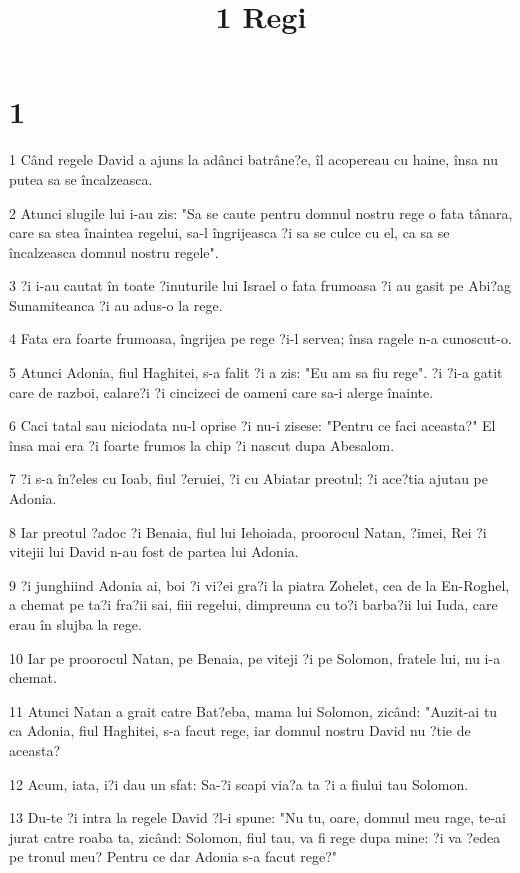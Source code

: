 

\title{1 Regi}


\chapter{1}

\par 1 Când regele David a ajuns la adânci batrâne?e, îl acopereau cu haine, însa nu putea sa se încalzeasca.
\par 2 Atunci slugile lui i-au zis: "Sa se caute pentru domnul nostru rege o fata tânara, care sa stea înaintea regelui, sa-l îngrijeasca ?i sa se culce cu el, ca sa se încalzeasca domnul nostru regele".
\par 3 ?i i-au cautat în toate ?inuturile lui Israel o fata frumoasa ?i au gasit pe Abi?ag Sunamiteanca ?i au adus-o la rege.
\par 4 Fata era foarte frumoasa, îngrijea pe rege ?i-l servea; însa ragele n-a cunoscut-o.
\par 5 Atunci Adonia, fiul Haghitei, s-a falit ?i a zis: "Eu am sa fiu rege". ?i ?i-a gatit care de razboi, calare?i ?i cincizeci de oameni care sa-i alerge înainte.
\par 6 Caci tatal sau niciodata nu-l oprise ?i nu-i zisese: "Pentru ce faci aceasta?" El însa mai era ?i foarte frumos la chip ?i nascut dupa Abesalom.
\par 7 ?i s-a în?eles cu Ioab, fiul ?eruiei, ?i cu Abiatar preotul; ?i ace?tia ajutau pe Adonia.
\par 8 Iar preotul ?adoc ?i Benaia, fiul lui Iehoiada, proorocul Natan, ?imei, Rei ?i vitejii lui David n-au fost de partea lui Adonia.
\par 9 ?i junghiind Adonia ai, boi ?i vi?ei gra?i la piatra Zohelet, cea de la En-Roghel, a chemat pe ta?i fra?ii sai, fiii regelui, dimpreuna cu to?i barba?ii lui Iuda, care erau în slujba la rege.
\par 10 Iar pe proorocul Natan, pe Benaia, pe viteji ?i pe Solomon, fratele lui, nu i-a chemat.
\par 11 Atunci Natan a grait catre Bat?eba, mama lui Solomon, zicând: "Auzit-ai tu ca Adonia, fiul Haghitei, s-a facut rege, iar domnul nostru David nu ?tie de aceasta?
\par 12 Acum, iata, i?i dau un sfat: Sa-?i scapi via?a ta ?i a fiului tau Solomon.
\par 13 Du-te ?i intra la regele David ?l-i spune: "Nu tu, oare, domnul meu rage, te-ai jurat catre roaba ta, zicând: Solomon, fiul tau, va fi rege dupa mine: ?i va ?edea pe tronul meu? Pentru ce dar Adonia s-a facut rege?"
